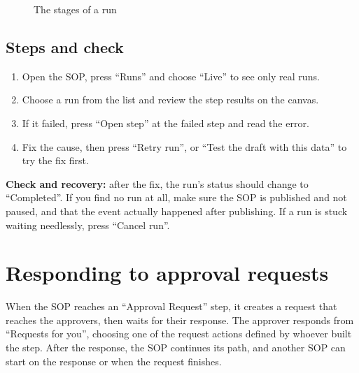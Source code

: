 \begin{figure}[H]
\centering
{}
\rclegend
\caption{The stages of a run}
\label{fig:builder-isop-runs-flow}
\end{figure}

\subsection{Steps and check}
\begin{enumerate}
\item Open the SOP, press “Runs” and choose “Live” to see only real runs.
\item Choose a run from the list and review the step results on the canvas.
\item If it failed, press “Open step” at the failed step and read the error.
\item Fix the cause, then press “Retry run”, or “Test the draft with this data” to try the fix first.
\end{enumerate}

\textbf{Check and recovery:} after the fix, the run's status should change to “Completed”. If you find no run at all, make sure the SOP is published and not paused, and that the event actually happened after publishing. If a run is stuck waiting needlessly, press “Cancel run”.

\clearpage
\section{Responding to approval requests}
\label{sec:builder-feature-isop-approvals}

When the SOP reaches an “Approval Request” step, it creates a request that reaches the approvers, then waits for their response. The approver responds from “Requests for you”, choosing one of the request actions defined by whoever built the step. After the response, the SOP continues its path, and another SOP can start on the response or when the request finishes.


